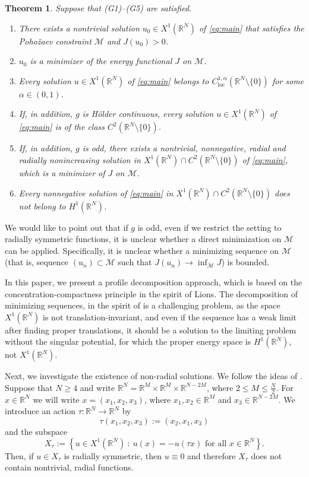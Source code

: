 \documentclass[12pt,leqno,twoside,sort]{amsart}
\newtheorem{Th}{Theorem}[section]
\newcommand{\R}{\mathbb{R}}
\newcommand{\cM}{{\mathcal M}}
\numberwithin{equation}{section}
\newcommand{\loc}{\mathrm{loc}}
\begin{document}
\begin{Th}\label{Th:Main1-Existence}
Suppose that (G1)--(G5) are satisfied. 
\begin{enumerate}
\item[(a)] There exists a nontrivial solution $u_0 \in X^1 (\R^N)$ of \eqref{eq:main} that satisfies the Poho\v{z}aev constraint $\cM$ and $J(u_0) > 0$. 
\item[(b)] $u_0$ is a minimizer of the energy functional $J$ on $\cM$.
\item[(c)] Every solution $u\in X^1(\R^N)$ of \eqref{eq:main} belongs to $C^{1,\alpha}_{\loc} (\R^N \setminus \{0\})$ for some $\alpha \in (0,1)$.
\item[(d)] If, in addition, $g$ is H\"older continuous, every solution $u\in X^1(\R^N)$ of \eqref{eq:main} is of the class $C^2 (\R^N\setminus \{0\})$.
\item[(e)] If, in addition, $g$ is odd, there exists a nontrivial, nonnegative, radial and radially nonincreasing solution in $X^1 (\R^N) \cap C^2 (\R^N \setminus \{0\})$ of \eqref{eq:main}, which is a minimizer of $J$ on $\cM$.
\item[(f)] Every nonnegative solution of \eqref{eq:main} in $X^1(\R^N) \cap C^2 (\R^N \setminus\{0\})$ does not belong to $H^1 (\R^N)$.
\end{enumerate}
\end{Th}

We would like to point out that if $g$ is odd, even if we restrict the setting to radially symmetric functions, it is unclear whether a direct minimization on $\cM$ can be applied. Specifically, it is unclear whether a minimizing sequence on $\cM$ (that is, sequence $(u_n) \subset \cM$ such that $J(u_n) \to \inf_{\cM} J$) is bounded.

In this paper, we present a profile decomposition approach, which is based on the concentration-compactness principle in the spirit of Lions. The decomposition of minimizing sequences, in the spirit of \cite{Nawa, Gerard} is a challenging problem, as the space $X^1 (\R^N)$ is not translation-invariant, and even if the sequence has a weak limit after finding proper translations, it should be a solution to the limiting problem without the singular potential, for which the proper energy space is $H^1 (\R^N)$, not $X^1 (\R^N)$.

Next, we investigate the existence of non-radial solutions. We follow the ideas of \cite{MR4173560}. Suppose that $N \geq 4$ and write $\R^N = \R^M \times \R^M \times \R^{N-2M}$, where $2 \leq M \leq \frac{N}{2}$. For $x \in \R^N$ we will write $x=(x_1, x_2, x_3)$, where $x_1, x_2 \in \R^M$ and $x_3 \in \R^{N-2M}$. We introduce an action $\tau : \R^N \rightarrow \R^N$ by
$$
\tau(x_1, x_2, x_3) := (x_2, x_1, x_3)
$$
and the subspace
\begin{equation}\label{eq:Xtau}
X_\tau := \left\{ u \in X^1 (\R^N) \ : \ u(x) = - u(\tau x) \mbox{ for all } x \in \R^N \right\}.
\end{equation}
Then, if $u \in X_\tau$ is radially symmetric, then $u \equiv 0$ and therefore $X_\tau$ does not contain nontrivial, radial functions.
\end{document}
